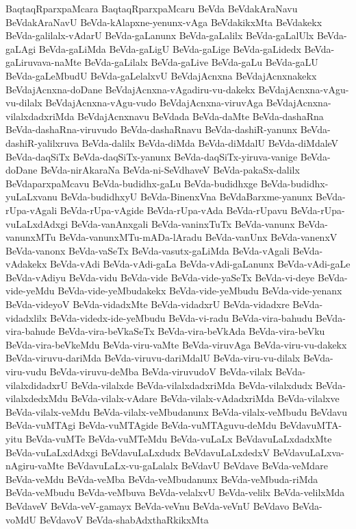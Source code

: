 {BaqtaqRparxpaMcara
BaqtaqRparxpaMcaru
BeVda
BeVdakAraNavu
BeVdakAraNavU
BeVda-kAlapxne-yenunx-vAga
BeVdakikxMta
BeVdakekx
BeVda-galilalx-vAdarU
BeVda-gaLanunx
BeVda-gaLalilx
BeVda-gaLalUlx
BeVda-gaLAgi
BeVda-gaLiMda
BeVda-gaLigU
BeVda-gaLige
BeVda-gaLidedx
BeVda-gaLiruvava-naMte
BeVda-gaLilalx
BeVda-gaLive
BeVda-gaLu
BeVda-gaLU
BeVda-gaLeMbudU
BeVda-gaLelalxvU
BeVdajAcnxna
BeVdajAcnxnakekx
BeVdajAcnxna-doDane
BeVdajAcnxna-vAgadiru-vu-dakekx
BeVdajAcnxna-vAgu-vu-dilalx
BeVdajAcnxna-vAgu-vudo
BeVdajAcnxna-viruvAga
BeVdajAcnxna-vilalxdadxriMda
BeVdajAcnxnavu
BeVdada
BeVda-daMte
BeVda-dashaRna
BeVda-dashaRna-viruvudo
BeVda-dashaRnavu
BeVda-dashiR-yanunx
BeVda-dashiR-yalilxruva
BeVda-dalilx
BeVda-diMda
BeVda-diMdalU
BeVda-diMdaleV
BeVda-daqSiTx
BeVda-daqSiTx-yanunx
BeVda-daqSiTx-yiruva-vanige
BeVda-doDane
BeVda-nirAkaraNa
BeVda-ni-SeVdhaveV
BeVda-pakaSx-dalilx
BeVdaparxpaMcavu
BeVda-budidhx-gaLu
BeVda-budidhxge
BeVda-budidhx-yuLaLxvanu
BeVda-budidhxyU
BeVda-BinenxVna
BeVdaBarxme-yanunx
BeVda-rUpa-vAgali
BeVda-rUpa-vAgide
BeVda-rUpa-vAda
BeVda-rUpavu
BeVda-rUpa-vuLaLxdAdxgi
BeVda-vanAnxgali
BeVda-vaninxTuTx
BeVda-vanunx
BeVda-vanunxMTu
BeVda-vanunxMTu-mADa-lAradu
BeVda-vanUnx
BeVda-vanenxV
BeVda-vanonx
BeVda-vaSeTx
BeVda-vasutx-gaLiMda
BeVda-vAgali
BeVda-vAdakekx
BeVda-vAdi
BeVda-vAdi-gaLa
BeVda-vAdi-gaLanunx
BeVda-vAdi-gaLe
BeVda-vAdiyu
BeVda-vidu
BeVda-vide
BeVda-vide-yaSeTx
BeVda-vi-deye
BeVda-vide-yeMdu
BeVda-vide-yeMbudakekx
BeVda-vide-yeMbudu
BeVda-vide-yenanx
BeVda-videyoV
BeVda-vidadxMte
BeVda-vidadxrU
BeVda-vidadxre
BeVda-vidadxlilx
BeVda-videdx-ide-yeMbudu
BeVda-vi-radu
BeVda-vira-bahudu
BeVda-vira-bahude
BeVda-vira-beVkaSeTx
BeVda-vira-beVkAda
BeVda-vira-beVku
BeVda-vira-beVkeMdu
BeVda-viru-vaMte
BeVda-viruvAga
BeVda-viru-vu-dakekx
BeVda-viruvu-dariMda
BeVda-viruvu-dariMdalU
BeVda-viru-vu-dilalx
BeVda-viru-vudu
BeVda-viruvu-deMba
BeVda-viruvudoV
BeVda-vilalx
BeVda-vilalxdidadxrU
BeVda-vilalxde
BeVda-vilalxdadxriMda
BeVda-vilalxdudx
BeVda-vilalxdedxMdu
BeVda-vilalx-vAdare
BeVda-vilalx-vAdadxriMda
BeVda-vilalxve
BeVda-vilalx-veMdu
BeVda-vilalx-veMbudanunx
BeVda-vilalx-veMbudu
BeVdavu
BeVda-vuMTAgi
BeVda-vuMTAgide
BeVda-vuMTAguvu-deMdu
BeVdavuMTA-yitu
BeVda-vuMTe
BeVda-vuMTeMdu
BeVda-vuLaLx
BeVdavuLaLxdadxMte
BeVda-vuLaLxdAdxgi
BeVdavuLaLxdudx
BeVdavuLaLxdedxV
BeVdavuLaLxva-nAgiru-vaMte
BeVdavuLaLx-vu-gaLalalx
BeVdavU
BeVdave
BeVda-veMdare
BeVda-veMdu
BeVda-veMba
BeVda-veMbudanunx
BeVda-veMbuda-riMda
BeVda-veMbudu
BeVda-veMbuva
BeVda-velalxvU
BeVda-velilx
BeVda-velilxMda
BeVdaveV
BeVda-veV-gamayx
BeVda-veVnu
BeVda-veVnU
BeVdavo
BeVda-voMdU
BeVdavoV
BeVda-shabAdxthaRkikxMta
}
